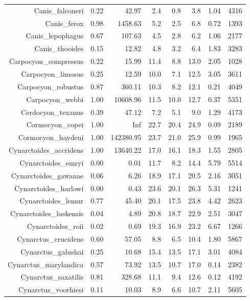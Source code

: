 \begin{table}[ht]
\begin{tabular}{rrrrrrrr}
  Canis\_falconeri & 0.22 & 42.97 & 2.4 & 0.8 & 3.8 & 1.04 & 4316 \\ 
  Canis\_ferox & 0.98 & 1458.63 & 5.2 & 2.5 & 6.8 & 0.72 & 1393 \\ 
  Canis\_lepophagus & 0.67 & 107.63 & 4.5 & 2.8 & 6.2 & 1.06 & 2177 \\ 
  Canis\_thooides & 0.15 & 12.82 & 4.8 & 3.2 & 6.4 & 1.83 & 3283 \\ 
  Carpocyon\_compressus & 0.22 & 15.99 & 11.4 & 8.8 & 13.0 & 2.05 & 1028 \\ 
  Carpocyon\_limosus & 0.25 & 12.59 & 10.0 & 7.1 & 12.5 & 3.05 & 3611 \\ 
  Carpocyon\_robustus & 0.87 & 360.11 & 10.3 & 8.2 & 12.1 & 0.21 & 4049 \\ 
  Carpocyon\_webbi & 1.00 & 10608.96 & 11.5 & 10.0 & 12.7 & 0.37 & 5351 \\ 
  Cerdocyon\_texanus & 0.39 & 47.12 & 7.2 & 5.1 & 9.0 & 1.29 & 4173 \\ 
  Cormocyon\_copei & 1.00 & Inf & 22.7 & 20.4 & 24.9 & 0.09 & 2189 \\ 
  Cormocyon\_haydeni & 1.00 & 142380.95 & 23.7 & 21.0 & 25.9 & 0.99 & 1965 \\ 
  Cynarctoides\_accridens & 1.00 & 13640.22 & 17.0 & 16.1 & 18.3 & 1.55 & 2805 \\ 
  Cynarctoides\_emryi & 0.00 & 0.01 & 11.7 & 8.2 & 14.4 & 5.79 & 5514 \\ 
  Cynarctoides\_gawanae & 0.06 & 6.26 & 18.9 & 17.1 & 20.5 & 2.16 & 3051 \\ 
  Cynarctoides\_harlowi & 0.00 & 0.43 & 23.6 & 20.1 & 26.3 & 5.31 & 1241 \\ 
  Cynarctoides\_lemur & 0.77 & 45.40 & 20.1 & 17.5 & 23.8 & 4.42 & 2623 \\ 
  Cynarctoides\_luskensis & 0.04 & 4.89 & 20.8 & 18.7 & 22.9 & 2.51 & 3047 \\ 
  Cynarctoides\_roii & 0.02 & 0.69 & 19.3 & 16.9 & 23.2 & 6.67 & 1266 \\ 
  Cynarctus\_crucidens & 0.60 & 57.05 & 8.8 & 6.5 & 10.4 & 1.80 & 5867 \\ 
  Cynarctus\_galushai & 0.25 & 10.68 & 15.4 & 13.5 & 17.1 & 3.01 & 4084 \\ 
  Cynarctus\_marylandica & 0.57 & 73.92 & 13.5 & 10.7 & 17.0 & 0.14 & 2382 \\ 
  Cynarctus\_saxatilis & 0.81 & 328.68 & 11.1 & 9.4 & 12.6 & 0.12 & 4192 \\ 
  Cynarctus\_voorhiesi & 0.11 & 10.03 & 8.9 & 6.6 & 10.7 & 2.11 & 5605 \\ 

\end{tabular}
\end{table}
